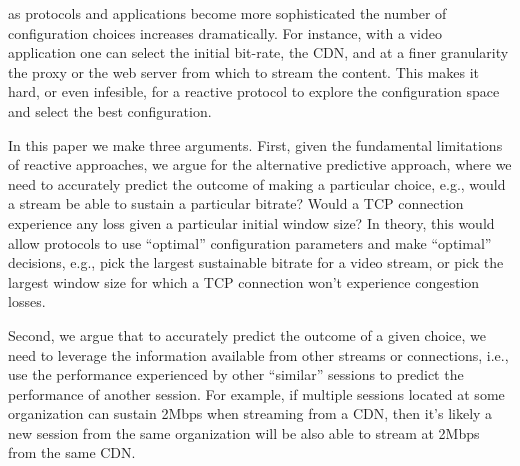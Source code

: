  as protocols and applications become more sophisticated the number of configuration choices increases dramatically. For instance, with a video application one can select the initial bit-rate, the CDN, and at a finer granularity the proxy or the web server from which to stream the content. This makes it hard, or even infesible, for a reactive protocol to explore the configuration space and select the best configuration.



In this paper we make three arguments. First, given the fundamental limitations of reactive approaches, we argue for the alternative predictive approach, where we need to accurately predict the outcome of making a particular choice, e.g., would a stream be able to sustain a particular bitrate? Would a TCP connection experience any loss given a particular initial window size? In theory, this would allow protocols to use ``optimal'' configuration parameters and make ``optimal'' decisions, e.g., pick the largest sustainable bitrate for a video stream,  or pick the largest window size for which a TCP connection won't experience congestion losses.

Second, we argue that to accurately predict the outcome of a given choice, we need to leverage the information available from other streams or connections, i.e., use the performance experienced by other ``similar'' sessions to predict the performance of another session. For example, if multiple sessions located at some organization can sustain 2Mbps when streaming from a CDN, then it's likely a new session from the same organization will be also able to stream at 2Mbps from the same CDN. 

